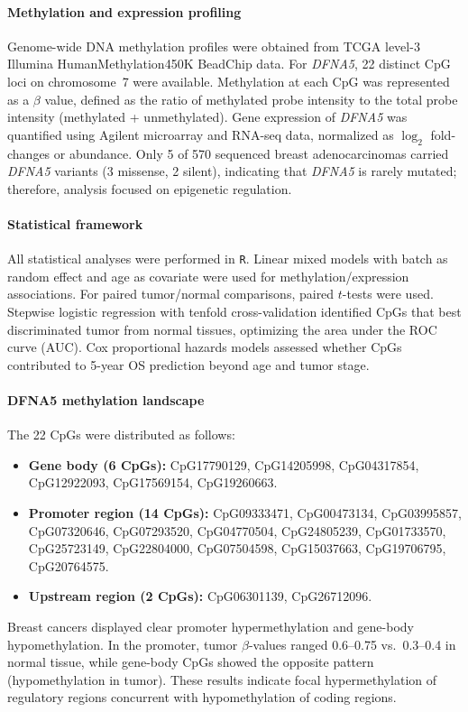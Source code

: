 \documentclass[10pt]{extarticle}
\begin{document}
\paragraph{Methylation and expression profiling}
Genome-wide DNA methylation profiles were obtained from TCGA level-3 Illumina HumanMethylation450K BeadChip data. For \textit{DFNA5}, 22 distinct CpG loci on chromosome~7 were available. Methylation at each CpG was represented as a $\beta$ value, defined as the ratio of methylated probe intensity to the total probe intensity (methylated + unmethylated). Gene expression of \textit{DFNA5} was quantified using Agilent microarray and RNA-seq data, normalized as $\log_2$ fold-changes or abundance. Only 5 of 570 sequenced breast adenocarcinomas carried \textit{DFNA5} variants (3 missense, 2 silent), indicating that \textit{DFNA5} is rarely mutated; therefore, analysis focused on epigenetic regulation.

\paragraph{Statistical framework}
All statistical analyses were performed in \texttt{R}. Linear mixed models with batch as random effect and age as covariate were used for methylation/expression associations. For paired tumor/normal comparisons, paired $t$-tests were used. Stepwise logistic regression with tenfold cross-validation identified CpGs that best discriminated tumor from normal tissues, optimizing the area under the ROC curve (AUC). Cox proportional hazards models assessed whether CpGs contributed to 5-year OS prediction beyond age and tumor stage.

\paragraph{DFNA5 methylation landscape}
The 22 CpGs were distributed as follows:
\begin{itemize}[label=-]
\item \textbf{Gene body (6 CpGs):} CpG17790129, CpG14205998, CpG04317854, CpG12922093, CpG17569154, CpG19260663.
\item \textbf{Promoter region (14 CpGs):} CpG09333471, CpG00473134, CpG03995857, CpG07320646, CpG07293520, CpG04770504, CpG24805239, CpG01733570, CpG25723149, CpG22804000, CpG07504598, CpG15037663, CpG19706795, CpG20764575.
\item \textbf{Upstream region (2 CpGs):} CpG06301139, CpG26712096.
\end{itemize}
Breast cancers displayed clear promoter hypermethylation and gene-body hypomethylation. In the promoter, tumor $\beta$-values ranged 0.6–0.75 vs.\ 0.3–0.4 in normal tissue, while gene-body CpGs showed the opposite pattern (hypomethylation in tumor). These results indicate focal hypermethylation of regulatory regions concurrent with hypomethylation of coding regions.
\end{document}
